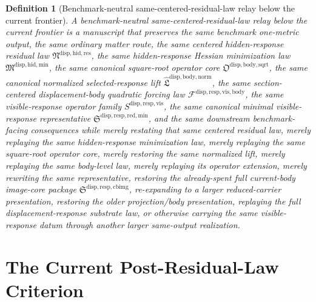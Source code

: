 \documentclass[11pt]{article}
\newcommand{\ResidualLawPackage}{\mathfrak N^{\mathrm{disp,hid,res}}}
\newcommand{\HiddenMinimizationPackage}{\mathfrak M^{\mathrm{disp,hid,min}}}
\newcommand{\SquareRootOperatorCore}{\mathfrak O^{\mathrm{disp,body,sqrt}}}
\newcommand{\NormalizedLiftPackage}{\widehat{\mathfrak L}^{\mathrm{disp,body,norm}}}
\newcommand{\VisibleBodyForcingLaw}{\mathscr F^{\mathrm{disp,resp,vis,body}}}
\newcommand{\VisibleResponseOperator}{S^{\mathrm{disp,resp,vis}}}
\newcommand{\MinimalReducedStructure}{\mathfrak S^{\mathrm{disp,resp,red,min}}}
\newcommand{\CurrentBodyImageCore}{\mathfrak S^{\mathrm{disp,resp,cbimg}}}
\newtheorem{definition}{Definition}
\begin{document}
\begin{definition}[Benchmark-neutral same-centered-residual-law relay below the current frontier]
A \emph{benchmark-neutral same-centered-residual-law relay below the current frontier} is a manuscript that preserves the same benchmark one-metric output, the same ordinary matter route, the same centered hidden-response residual law \(\ResidualLawPackage\), the same hidden-response Hessian minimization law \(\HiddenMinimizationPackage\), the same canonical square-root operator core \(\SquareRootOperatorCore\), the same canonical normalized selected-response lift \(\NormalizedLiftPackage\), the same section-centered displacement-body quadratic forcing law \(\VisibleBodyForcingLaw\), the same visible-response operator family \(\VisibleResponseOperator\), the same canonical minimal visible-response representative \(\MinimalReducedStructure\), and the same downstream benchmark-facing consequences while merely restating that same centered residual law, merely replaying the same hidden-response minimization law, merely replaying the same square-root operator core, merely restoring the same normalized lift, merely replaying the same body-level law, merely replaying its operator extension, merely rewriting the same representative, restoring the already-spent full current-body image-core package \(\CurrentBodyImageCore\), re-expanding to a larger reduced-carrier presentation, restoring the older projection/body presentation, replaying the full displacement-response substrate law, or otherwise carrying the same visible-response datum through another larger same-output realization.
\end{definition}

\section{The Current Post-Residual-Law Criterion}
\end{document}
